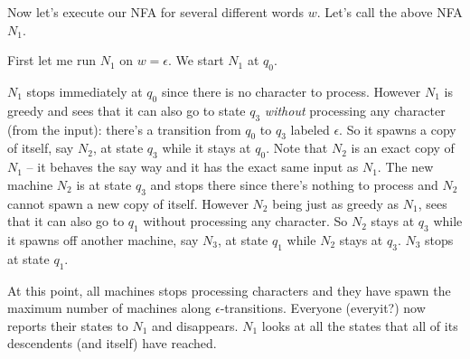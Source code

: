 Now let's execute our NFA for several different words $w$. 
Let's call the above NFA $N_1$.

\begin{center}
\end{center}


First let me run $N_1$ on $w = \epsilon$. We start $N_1$ at $q_0$. 
\begin{enumerate}
\li $N_1$ stops immediately at $q_0$ since there is no character to process.
\li However $N_1$ is greedy and sees that it can also go to state $q_3$
\textit{without} processing any character (from the input):
    there's a transition from $q_0$ to $q_3$ labeled $\epsilon$.
    So it spawns a copy of itself, say $N_2$, at state $q_3$ while
    it stays at $q_0$.
    Note that $N_2$ is an exact copy of $N_1$ -- it behaves the say
    way and it has the exact same input as $N_1$. 
    The new machine $N_2$ is at state $q_3$ and stops there since there's
    nothing to process and $N_2$ cannot spawn a new copy of itself.
\li However $N_2$ being just as greedy as $N_1$,
    sees that it can also go to $q_1$ without processing any character.
    So $N_2$ stays at $q_3$ while it spawns off another machine, 
    say $N_3$, at state $q_1$ while $N_2$ stays at $q_3$.
    $N_3$ stops at state $q_1$. 
\end{enumerate}
At this point, all machines stops processing characters and 
they have spawn the maximum number of machines along 
$\epsilon$-transitions. 
Everyone (everyit?) now reports their states to $N_1$ and disappears.
$N_1$ looks at all the states that all of its descendents (and itself) have
reached.

